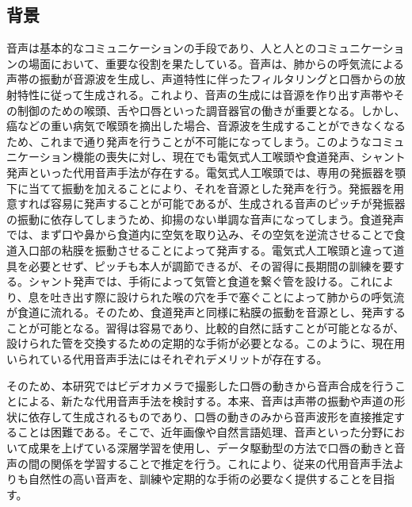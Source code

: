 \documentclass[12pt]{jarticle}
\numberwithin{equation}{section}    %
\numberwithin{figure}{section}      %
\numberwithin{table}{section}      %
\begin{document}
\subsection{背景}
音声は基本的なコミュニケーションの手段であり、人と人とのコミュニケーションの場面において、重要な役割を果たしている。音声は、肺からの呼気流による声帯の振動が音源波を生成し、声道特性に伴ったフィルタリングと口唇からの放射特性に従って生成される。これより、音声の生成には音源を作り出す声帯やその制御のための喉頭、舌や口唇といった調音器官の働きが重要となる。しかし、癌などの重い病気で喉頭を摘出した場合、音源波を生成することができなくなるため、これまで通り発声を行うことが不可能になってしまう。このようなコミュニケーション機能の喪失に対し、現在でも電気式人工喉頭や食道発声、シャント発声といった代用音声手法が存在する。電気式人工喉頭では、専用の発振器を顎下に当てて振動を加えることにより、それを音源とした発声を行う。発振器を用意すれば容易に発声することが可能であるが、生成される音声のピッチが発振器の振動に依存してしまうため、抑揚のない単調な音声になってしまう。食道発声では、まず口や鼻から食道内に空気を取り込み、その空気を逆流させることで食道入口部の粘膜を振動させることによって発声する。電気式人工喉頭と違って道具を必要とせず、ピッチも本人が調節できるが、その習得に長期間の訓練を要する。シャント発声では、手術によって気管と食道を繋ぐ管を設ける。これにより、息を吐き出す際に設けられた喉の穴を手で塞ぐことによって肺からの呼気流が食道に流れる。そのため、食道発声と同様に粘膜の振動を音源とし、発声することが可能となる。習得は容易であり、比較的自然に話すことが可能となるが、設けられた管を交換するための定期的な手術が必要となる。このように、現在用いられている代用音声手法にはそれぞれデメリットが存在する。

そのため、本研究ではビデオカメラで撮影した口唇の動きから音声合成を行うことによる、新たな代用音声手法を検討する。本来、音声は声帯の振動や声道の形状に依存して生成されるものであり、口唇の動きのみから音声波形を直接推定することは困難である。そこで、近年画像や自然言語処理、音声といった分野において成果を上げている深層学習を使用し、データ駆動型の方法で口唇の動きと音声の間の関係を学習することで推定を行う。これにより、従来の代用音声手法よりも自然性の高い音声を、訓練や定期的な手術の必要なく提供することを目指す。
\end{document}
